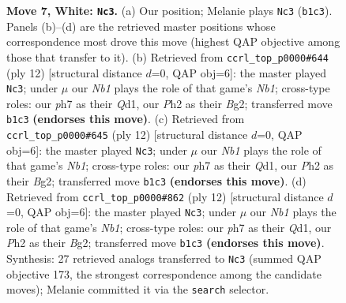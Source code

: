 \documentclass[11pt]{article}
\begin{document}
\begin{figure}[p]
\caption{\textbf{Move 7, White: \texttt{Nc3}.} (a) Our position; Melanie plays \texttt{Nc3} (\texttt{b1c3}). Panels (b)--(d) are the retrieved master positions whose correspondence most drove this move (highest QAP objective among those that transfer to it). (b) Retrieved from \texttt{ccrl\_top\_p0000\#644} (ply 12) [structural distance $d$=0, QAP obj=6]: the master played \texttt{Nc3}; under $\mu$ our \emph{Nb1} plays the role of that game's \emph{Nb1}; cross-type roles: our \emph{p}h7 as their \emph{Q}d1, our \emph{P}h2 as their \emph{B}g2; transferred move \texttt{b1c3} \textbf{(endorses this move)}. (c) Retrieved from \texttt{ccrl\_top\_p0000\#645} (ply 12) [structural distance $d$=0, QAP obj=6]: the master played \texttt{Nc3}; under $\mu$ our \emph{Nb1} plays the role of that game's \emph{Nb1}; cross-type roles: our \emph{p}h7 as their \emph{Q}d1, our \emph{P}h2 as their \emph{B}g2; transferred move \texttt{b1c3} \textbf{(endorses this move)}. (d) Retrieved from \texttt{ccrl\_top\_p0000\#862} (ply 12) [structural distance $d$=0, QAP obj=6]: the master played \texttt{Nc3}; under $\mu$ our \emph{Nb1} plays the role of that game's \emph{Nb1}; cross-type roles: our \emph{p}h7 as their \emph{Q}d1, our \emph{P}h2 as their \emph{B}g2; transferred move \texttt{b1c3} \textbf{(endorses this move)}. Synthesis: 27 retrieved analogs transferred to \texttt{Nc3} (summed QAP objective 173, the strongest correspondence among the candidate moves); Melanie committed it via the \texttt{search} selector.}
\label{fig:thought-m12}
\end{figure}

\clearpage
\end{document}
